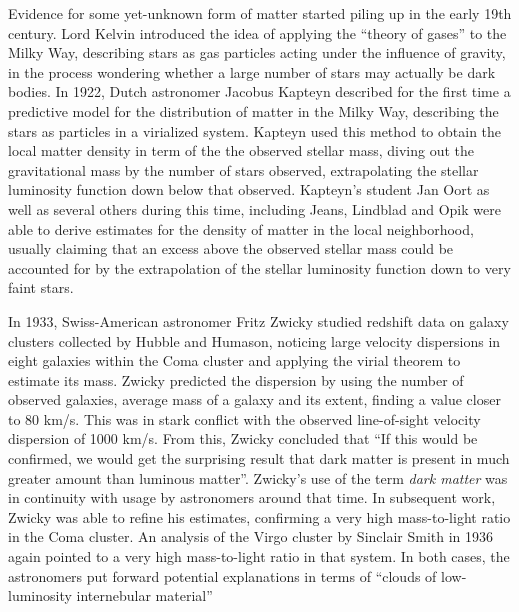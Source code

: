 Evidence for some yet-unknown form of matter started piling up in the early 19th century. Lord Kelvin introduced the idea of applying the ``theory of gases'' to the Milky Way, describing stars as gas particles acting under the influence of gravity, in the process wondering whether a large number of stars may actually be dark bodies. In 1922, Dutch astronomer Jacobus Kapteyn described for the first time a predictive model for the distribution of matter in the Milky Way, describing the stars as particles in a virialized system. Kapteyn used this method to obtain the local matter density in term of the the observed stellar mass, diving out the gravitational mass by the number of stars observed, extrapolating the stellar luminosity function down below that observed. Kapteyn's student Jan Oort as well as several others during this time, including Jeans, Lindblad and Opik were able to derive estimates for the density of matter in the local neighborhood, usually claiming that an excess above the observed stellar mass could be accounted for by the extrapolation of the stellar luminosity function down to very faint stars.

In 1933, Swiss-American astronomer Fritz Zwicky studied redshift data on galaxy clusters collected by Hubble and Humason, noticing large velocity dispersions in eight galaxies within the Coma cluster and applying the virial theorem to estimate its mass. Zwicky predicted the dispersion by using the number of observed galaxies, average mass of a galaxy and its extent, finding a value closer to 80 km/s. This was in stark conflict with the observed line-of-sight velocity dispersion of 1000 km/s. From this, Zwicky concluded that ``If this would be confirmed, we would get the surprising result that dark matter is present in much greater amount than luminous matter''. Zwicky's use of the term \emph{dark matter} was in continuity with usage by astronomers around that time. In subsequent work, Zwicky was able to refine his estimates, confirming a very high mass-to-light ratio in the Coma cluster. An analysis of the Virgo cluster by Sinclair Smith in 1936 again pointed to a very high mass-to-light ratio in that system. In both cases, the astronomers put forward potential explanations in terms of ``clouds of low-luminosity internebular material''

